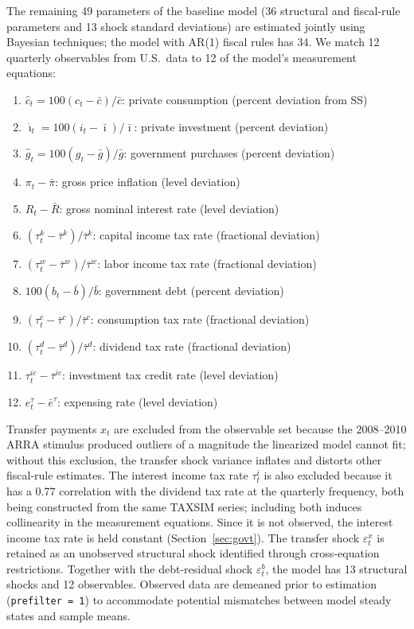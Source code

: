 \documentclass[article,11pt,letterpaper,fleqn]{article}
\theoremstyle{definition}
\numberwithin{equation}{section}
\begin{document}
The remaining 49 parameters of the baseline model (36 structural and fiscal-rule parameters and 13 shock standard deviations) are estimated jointly using Bayesian techniques; the model with AR(1) fiscal rules has 34. We match 12 quarterly observables from U.S.\ data to 12 of the model's measurement equations:
\begin{enumerate}
\item $\hat{c}_t = 100(c_t - \bar{c})/\bar{c}$: private consumption (percent deviation from SS)
\item $\hat{\imath}_t = 100(i_t - \bar{\imath})/\bar{\imath}$: private investment (percent deviation)
\item $\hat{g}_t = 100(g_t - \bar{g})/\bar{g}$: government purchases (percent deviation)
\item $\pi_t - \bar{\pi}$: gross price inflation (level deviation)
\item $R_t - \bar{R}$: gross nominal interest rate (level deviation)
\item $(\tau_t^k - \bar{\tau}^k)/\bar{\tau}^k$: capital income tax rate (fractional deviation)
\item $(\tau_t^w - \bar{\tau}^w)/\bar{\tau}^w$: labor income tax rate (fractional deviation)
\item $100(b_t - \bar{b})/\bar{b}$: government debt (percent deviation)
\item $(\tau_t^c - \bar{\tau}^c)/\bar{\tau}^c$: consumption tax rate (fractional deviation)
\item $(\tau_t^d - \bar{\tau}^d)/\bar{\tau}^d$: dividend tax rate (fractional deviation)
\item $\tau_t^{ic} - \bar{\tau}^{ic}$: investment tax credit rate (level deviation)
\item $e_t^{\tau} - \bar{e}^{\tau}$: expensing rate (level deviation)
\end{enumerate}
Transfer payments $x_t$ are excluded from the observable set because the 2008--2010 ARRA stimulus produced outliers of a magnitude the linearized model cannot fit; without this exclusion, the transfer shock variance inflates and distorts other fiscal-rule estimates. The interest income tax rate $\tau_t^i$ is also excluded because it has a 0.77 correlation with the dividend tax rate at the quarterly frequency, both being constructed from the same TAXSIM series; including both induces collinearity in the measurement equations. Since it is not observed, the interest income tax rate is held constant (Section~\ref{sec:govt}). The transfer shock $\varepsilon_t^{x}$ is retained as an unobserved structural shock identified through cross-equation restrictions. Together with the debt-residual shock $\varepsilon_t^b$, the model has 13 structural shocks and 12 observables. Observed data are demeaned prior to estimation (\texttt{prefilter = 1}) to accommodate potential mismatches between model steady states and sample means.
\end{document}
